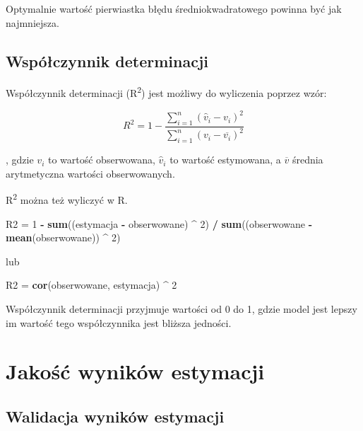\documentclass[
  paper=6in:9in,pagesize=pdftex,headinclude=on,footinclude=on,10pt]{scrbook}
\newenvironment{Shaded}{\begin{snugshade}}{\end{snugshade}}
\newcommand{\DecValTok}[1]{\textcolor[rgb]{0.00,0.00,0.81}{#1}}
\newcommand{\FunctionTok}[1]{\textcolor[rgb]{0.13,0.29,0.53}{\textbf{#1}}}
\newcommand{\NormalTok}[1]{#1}
\newcommand{\OtherTok}[1]{\textcolor[rgb]{0.56,0.35,0.01}{#1}}
\newcommand{\SpecialCharTok}[1]{\textcolor[rgb]{0.81,0.36,0.00}{\textbf{#1}}}
\begin{document}
Optymalnie wartość pierwiastka błędu średniokwadratowego powinna być jak najmniejsza.

\subsection{Współczynnik determinacji}\label{wspuxf3ux142czynnik-determinacji}

Współczynnik determinacji (R\textsuperscript{2}) jest możliwy do wyliczenia poprzez wzór:

\[ R^2 = 1 - \frac{\sum_{i=1}^{n} (\hat v_i - v_i)^2}{\sum_{i=1}^{n} (v_i - \overline{v_i})^2} \]

, gdzie \(v_i\) to wartość obserwowana, \(\hat{v}_i\) to wartość estymowana, a \(\overline{v}\) średnia arytmetyczna wartości obserwowanych.

R\textsuperscript{2} można też wyliczyć w R.

\begin{Shaded}
\begin{Highlighting}[]
\NormalTok{R2 }\OtherTok{=} \DecValTok{1} \SpecialCharTok{{-}} \FunctionTok{sum}\NormalTok{((estymacja }\SpecialCharTok{{-}}\NormalTok{ obserwowane) }\SpecialCharTok{\^{}} \DecValTok{2}\NormalTok{) }\SpecialCharTok{/}
    \FunctionTok{sum}\NormalTok{((obserwowane }\SpecialCharTok{{-}} \FunctionTok{mean}\NormalTok{(obserwowane)) }\SpecialCharTok{\^{}} \DecValTok{2}\NormalTok{)}
\end{Highlighting}
\end{Shaded}

lub

\begin{Shaded}
\begin{Highlighting}[]
\NormalTok{R2 }\OtherTok{=} \FunctionTok{cor}\NormalTok{(obserwowane, estymacja) }\SpecialCharTok{\^{}} \DecValTok{2}
\end{Highlighting}
\end{Shaded}

Współczynnik determinacji przyjmuje wartości od 0 do 1, gdzie model jest lepszy im wartość tego współczynnika jest bliższa jedności.

\section{Jakość wyników estymacji}\label{jakoux15bux107-wynikuxf3w-estymacji}

\subsection{Walidacja wyników estymacji}\label{walidacja-wynikuxf3w-estymacji}
\end{document}
